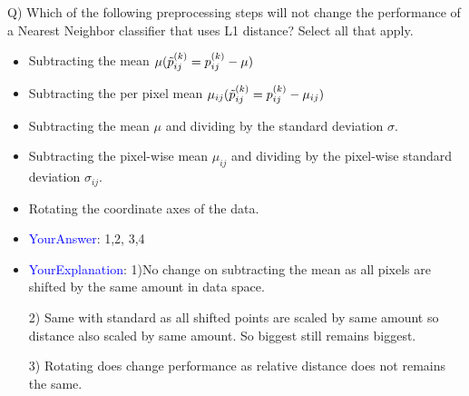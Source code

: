 \documentclass[twoside]{article}
\begin{document}
Q) Which of the following preprocessing steps will not change the performance of a Nearest Neighbor classifier that uses L1 distance? Select all that apply.
\begin{itemize}
\item Subtracting the mean  $\mu(\Tilde{p}^{(k)}_{ij}=p^{(k)}_{ij} - \mu)$
\item Subtracting the per pixel mean  $\mu_{ij}(\Tilde{p}^{(k)}_{ij}=p^{(k)}_{ij} - \mu_{ij})$
\item Subtracting the mean  $\mu$  and dividing by the standard deviation  $\sigma$.
\item Subtracting the pixel-wise mean  $\mu_{ij}$  and dividing by the pixel-wise standard deviation  $\sigma_{ij}$.

\item Rotating the coordinate axes of the data.

\item \textcolor{blue}{YourAnswer}:  1,2, 3,4

\item \textcolor{blue}{YourExplanation}:  1)No change on subtracting the mean as all pixels are shifted by the same amount in data space.

2) Same with standard as all shifted points are scaled by same amount so distance also scaled by same amount. So biggest still remains biggest.

3) Rotating does change performance as relative distance does not remains the same.

\end{itemize}

\end{document}
